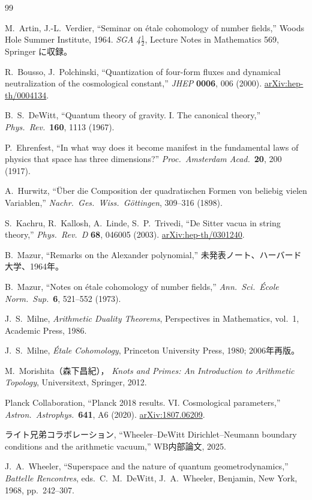 \documentclass[12pt,a4paper]{article}
\theoremstyle{definition}
\begin{document}
\begin{thebibliography}{99}

M.~Artin, J.-L.~Verdier,
``Seminar on \'etale cohomology of number fields,''
Woods Hole Summer Institute, 1964.
\textit{SGA 4$\frac{1}{2}$}, Lecture Notes in Mathematics 569, Springer に収録。

R.~Bousso, J.~Polchinski,
``Quantization of four-form fluxes and dynamical neutralization of the cosmological
constant,''
\textit{JHEP} \textbf{0006}, 006 (2000).
\href{https://arxiv.org/abs/hep-th/0004134}{arXiv:hep-th/0004134}.

B.~S.~DeWitt,
``Quantum theory of gravity. I. The canonical theory,''
\textit{Phys.\ Rev.}\ \textbf{160}, 1113 (1967).

P.~Ehrenfest,
``In what way does it become manifest in the fundamental laws of physics that space
has three dimensions?''
\textit{Proc.\ Amsterdam Acad.}\ \textbf{20}, 200 (1917).

A.~Hurwitz,
``\"Uber die Composition der quadratischen Formen von beliebig vielen Variablen,''
\textit{Nachr.\ Ges.\ Wiss.\ G\"ottingen}, 309--316 (1898).

S.~Kachru, R.~Kallosh, A.~Linde, S.~P.~Trivedi,
``De Sitter vacua in string theory,''
\textit{Phys.\ Rev.\ D} \textbf{68}, 046005 (2003).
\href{https://arxiv.org/abs/hep-th/0301240}{arXiv:hep-th/0301240}.

B.~Mazur,
``Remarks on the Alexander polynomial,''
未発表ノート、ハーバード大学、1964年。

B.~Mazur,
``Notes on \'etale cohomology of number fields,''
\textit{Ann.\ Sci.\ \'Ecole Norm.\ Sup.}\ \textbf{6}, 521--552 (1973).

J.~S.~Milne,
\textit{Arithmetic Duality Theorems},
Perspectives in Mathematics, vol.~1, Academic Press, 1986.

J.~S.~Milne,
\textit{\'Etale Cohomology},
Princeton University Press, 1980; 2006年再版。

M.~Morishita（森下昌紀），
\textit{Knots and Primes: An Introduction to Arithmetic Topology},
Universitext, Springer, 2012.

Planck Collaboration,
``Planck 2018 results. VI. Cosmological parameters,''
\textit{Astron.\ Astrophys.}\ \textbf{641}, A6 (2020).
\href{https://arxiv.org/abs/1807.06209}{arXiv:1807.06209}.

ライト兄弟コラボレーション,
``Wheeler--DeWitt Dirichlet--Neumann boundary conditions and the arithmetic vacuum,''
WB内部論文, 2025.

J.~A.~Wheeler,
``Superspace and the nature of quantum geometrodynamics,''
\textit{Battelle Rencontres}, eds.\ C.~M.~DeWitt, J.~A.~Wheeler,
Benjamin, New York, 1968, pp.~242--307.

\end{thebibliography}
\end{document}
